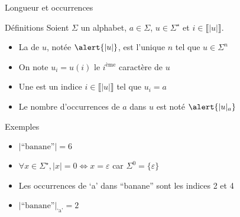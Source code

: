 
\begingroup

\begin{frame}{Longueur et occurrences}
  
  \begin{block}{Définitions}
    Soient $\Sigma$ un alphabet, $a\in\Sigma$, $u\in \Sigma^\star$ et $i\in \llbracket |u|\rrbracket$.
    \begin{itemize}
    \item La  de $u$, notée $\alert{|u|}$, est l'unique $n$ tel que $u\in \Sigma^n$
    \item On note \alert{$u_i = u(i)$} le $i^\text{ème}$ caractère de $u$
    \item Une  est un indice $i\in \llbracket |u|\rrbracket$ tel que $u_i = a$
    \item Le nombre d'occurrences de $a$ dans $u$ est noté $\alert{|u|_a}$
    \end{itemize}
  \end{block}
  
  \begin{exampleblock}{Exemples}
    \begin{itemize}
    \item $|\text{``banane''}| = 6$
    \item $\forall x\in \Sigma^\star, |x| = 0 \Leftrightarrow x = \varepsilon$ car $\Sigma^0 = \{\varepsilon\}$
    \item Les occurrences de `a' dans ``banane'' sont les indices 2 et 4
    \item $|\text{``banane''}|_{\text{`a'}} = 2$
    \end{itemize}
  \end{exampleblock}

\end{frame}

\endgroup
